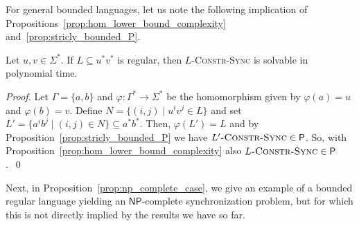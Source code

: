 \documentclass[runningheads,envcountsame]{llncs}
\theoremstyle{plain}
\theoremstyle{definition}
\newcommand{\NP}{\textsf{NP}}
\newcommand{\PTIME}{\textsf{P}}
\begin{document}
For general bounded languages, let us note the following implication of Propositions~\ref{prop:hom_lower_bound_complexity}
and~\ref{prop:stricly_bounded_P}.


\begin{propositionrep}
 Let $u,v \in \Sigma^*$. If $L \subseteq u^* v^*$ is regular, then $L$\textsc{-Constr-Sync} is solvable
 in polynomial time.
\end{propositionrep}
\begin{proof}
 Let $\Gamma = \{a,b\}$
 and $\varphi : \Gamma^* \to \Sigma^*$
 be the homomorphism given by $\varphi(a) = u$
 and $\varphi(b) = v$.
 Define $N = \{ (i,j) \mid u^i v^j \in L \}$
 and set $L' = \{ a^i b^j \mid (i,j) \in N \} \subseteq a^* b^*$.
 Then, $\varphi(L') = L$
 and by Proposition~\ref{prop:stricly_bounded_P}
 we have $L'\textsc{-Constr-Sync} \in \PTIME$.
 So, with Proposition~\ref{prop:hom_lower_bound_complexity}
 also $L\textsc{-Constr-Sync} \in \PTIME$.~\qed
\end{proof}

Next, in Proposition~\ref{prop:np_complete_case}, we give an example
of a bounded regular language yielding an $\NP$-complete synchronization problem,
 but for which this is
 not directly implied by the results we have so far.

 
\end{document}
